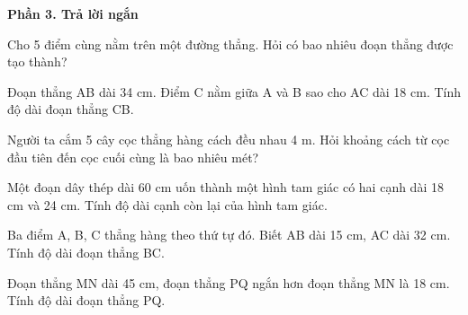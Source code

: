 \textbf{Phần 3. Trả lời ngắn}

\begin{ex} %
Cho 5 điểm cùng nằm trên một đường thẳng. Hỏi có bao nhiêu đoạn thẳng được tạo thành?
\end{ex}

\begin{ex} %
Đoạn thẳng AB dài 34 cm. Điểm C nằm giữa A và B sao cho AC dài 18 cm. Tính độ dài đoạn thẳng CB.
\end{ex}

\begin{ex} %
Người ta cắm 5 cây cọc thẳng hàng cách đều nhau 4 m. Hỏi khoảng cách từ cọc đầu tiên đến cọc cuối cùng là bao nhiêu mét?
\end{ex}

\begin{ex} %
Một đoạn dây thép dài 60 cm uốn thành một hình tam giác có hai cạnh dài 18 cm và 24 cm. Tính độ dài cạnh còn lại của hình tam giác.
\end{ex}

\begin{ex} %
Ba điểm A, B, C thẳng hàng theo thứ tự đó. Biết AB dài 15 cm, AC dài 32 cm. Tính độ dài đoạn thẳng BC.
\end{ex}

\begin{ex} %
Đoạn thẳng MN dài 45 cm, đoạn thẳng PQ ngắn hơn đoạn thẳng MN là 18 cm. Tính độ dài đoạn thẳng PQ.
\end{ex}

